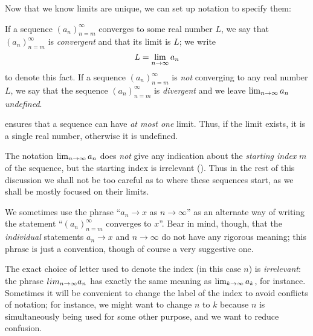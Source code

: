 Now that we know limits are unique, we can set up notation to specify them:

\begin{definition}  \label{def 6.1.8}
If a sequence \((a_n)_{n = m}^{\infty}\) converges to some real number \(L\), we say that \((a_n)_{n = m}^{\infty}\) is \emph{convergent} and that its limit is \(L\);
we write
\[
    L = \lim_{n \to \infty} a_n
\]
to denote this fact.
If a sequence \((a_n)_{n = m}^{\infty}\) is \emph{not} converging to any real number \(L\), we say that the sequence \((a_n)_{n = m}^{\infty}\) is \emph{divergent} and we leave \(\lim_{n \to \infty} a_n\) \emph{undefined}.
\end{definition}

\begin{note}
 ensures that a sequence can have \emph{at most one} limit.
Thus, if the limit exists, it is a single real number, otherwise
it is undefined.
\end{note}

\begin{remark} \label{remark 6.1.9}
The notation \(\lim_{n \to \infty} a_n\) does \emph{not} give any indication about the \emph{starting index} \(m\) of the sequence,
but the starting index is irrelevant ().
Thus in the rest of this discussion we shall not be too careful as to where these sequences start, as we shall be mostly focused on their limits.
\end{remark}

\begin{note}
We sometimes use the phrase ``\(a_n \to x\) as \(n \to \infty\)'' as an alternate way of writing the statement ``\((a_n)_{n = m}^{\infty}\) converges to \(x\)''.
Bear in mind, though, that the \emph{individual} statements \(a_n \to x\) and \(n \to \infty\) do not have any rigorous meaning;
this phrase is just a convention, though of course a very suggestive one.
\end{note}

\begin{remark} \label{remark 6.1.10}
The exact choice of letter used to denote the index (in this case \(n\)) is \emph{irrelevant}:
the phrase \(lim_{n \to \infty} a_n\) has exactly the same meaning as \(\lim_{k \to \infty} a_k\), for instance.
Sometimes it will be convenient to change the label of the index to avoid conflicts of notation;
for instance, we might want to change \(n\) to \(k\) because \(n\) is simultaneously being used for some other purpose, and we want to reduce confusion.
\end{remark}

